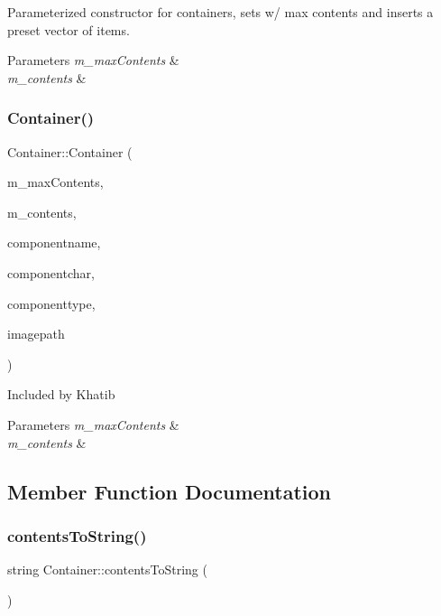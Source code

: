 Parameterized constructor for containers, sets w/ max contents and inserts a preset vector of items. 


\begin{DoxyParams}{Parameters}
{\em m\+\_\+max\+Contents} & \\
\hline
{\em m\+\_\+contents} & \\
\hline
\end{DoxyParams}
\hypertarget{class_container_ab7f8067097f7f58cb1b251069af3c8ad}{}\label{class_container_ab7f8067097f7f58cb1b251069af3c8ad} 
\subsubsection{\texorpdfstring{Container()}{Container()}\hspace{0.1cm}{\footnotesize\ttfamily [2/2]}}
{\footnotesize\ttfamily Container\+::\+Container (\begin{DoxyParamCaption}\item[{int}]{m\+\_\+max\+Contents,  }\item[{vector$<$ \hyperlink{class_item}{Item} $\ast$$>$}]{m\+\_\+contents,  }\item[{std\+::string}]{componentname,  }\item[{char}]{componentchar,  }\item[{gameplay\+Grid\+Component\+Types}]{componenttype,  }\item[{std\+::string}]{imagepath }\end{DoxyParamCaption})}

Included by Khatib 
\begin{DoxyParams}{Parameters}
{\em m\+\_\+max\+Contents} & \\
\hline
{\em m\+\_\+contents} & \\
\hline
\end{DoxyParams}


\subsection{Member Function Documentation}
\hypertarget{class_container_ab00aa23e1f650444e153301a7a247116}{}\label{class_container_ab00aa23e1f650444e153301a7a247116} 
\subsubsection{\texorpdfstring{contents\+To\+String()}{contentsToString()}}
{\footnotesize\ttfamily string Container\+::contents\+To\+String (\begin{DoxyParamCaption}{ }\end{DoxyParamCaption})}

